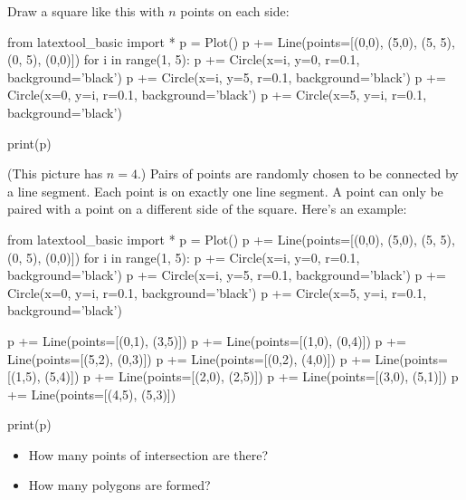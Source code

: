   Draw a square like this with $n$ points on each side:
  \begin{python}
from latextool_basic import *
p = Plot()
p += Line(points=[(0,0), (5,0), (5, 5), (0, 5), (0,0)])
for i in range(1, 5):
    p += Circle(x=i, y=0, r=0.1, background='black')
    p += Circle(x=i, y=5, r=0.1, background='black')
    p += Circle(x=0, y=i, r=0.1, background='black')
    p += Circle(x=5, y=i, r=0.1, background='black')

print(p)
  \end{python}
  (This picture has $n = 4$.)
  Pairs of points are randomly chosen to be connected
  by a line segment.
  Each point is on exactly one line segment.
  A point can only be paired with a point on a different side of the square.
  Here's an example:
    \begin{python}
from latextool_basic import *
p = Plot()
p += Line(points=[(0,0), (5,0), (5, 5), (0, 5), (0,0)])
for i in range(1, 5):
    p += Circle(x=i, y=0, r=0.1, background='black')
    p += Circle(x=i, y=5, r=0.1, background='black')
    p += Circle(x=0, y=i, r=0.1, background='black')
    p += Circle(x=5, y=i, r=0.1, background='black')

p += Line(points=[(0,1), (3,5)])
p += Line(points=[(1,0), (0,4)])
p += Line(points=[(5,2), (0,3)])
p += Line(points=[(0,2), (4,0)])
p += Line(points=[(1,5), (5,4)])
p += Line(points=[(2,0), (2,5)])
p += Line(points=[(3,0), (5,1)])
p += Line(points=[(4,5), (5,3)])
    
print(p)
  \end{python}
  \begin{itemize}
  \item How many points of intersection are there?
  \item How many polygons are formed?
  \end{itemize}
